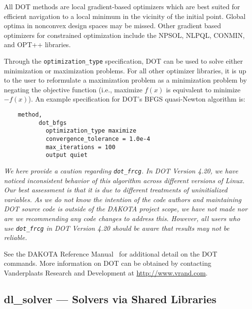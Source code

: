 All DOT methods are local gradient-based optimizers which are best
suited for efficient navigation to a local minimum in the vicinity of
the initial point. Global optima in nonconvex design spaces may be
missed. Other gradient based optimizers for constrained optimization
include the NPSOL, NLPQL, CONMIN, and OPT++ libraries.

Through the \texttt{optimization\_type} specification, DOT can be used
to solve either minimization or maximization problems. For all other
optimizer libraries, it is up to the user to reformulate a
maximization problem as a minimization problem by negating the
objective function (i.e., maximize $f(x)$ is equivalent to minimize
$-f(x)$). An example specification for DOT's BFGS quasi-Newton
algorithm is:
\begin{small}
\begin{verbatim}
    method,
          dot_bfgs
            optimization_type maximize
            convergence_tolerance = 1.0e-4
            max_iterations = 100
            output quiet
\end{verbatim}
\end{small}

\emph{We here provide a caution regarding \texttt{dot\_frcg}.  In DOT
Version 4.20, we have noticed inconsistent behavior of this algorithm
across different versions of Linux.  Our best assessment is that it is
due to different treatments of uninitialized variables.  As we do not
know the intention of the code authors and maintaining DOT source code
is outside of the DAKOTA project scope, we have not made nor are we
recommending any code changes to address this.  However, all users who
use \texttt{dot\_frcg} in DOT Version 4.20 should be aware that
results may not be reliable.}

See the DAKOTA
Reference Manual~\cite{RefMan} for additional detail on the DOT
commands. More information on DOT can be obtained by contacting
Vanderplaats Research and Development at \url{http://www.vrand.com}.

\subsection{dl\_solver --- Solvers via Shared Libraries}\label{opt:software:dlsolver}

